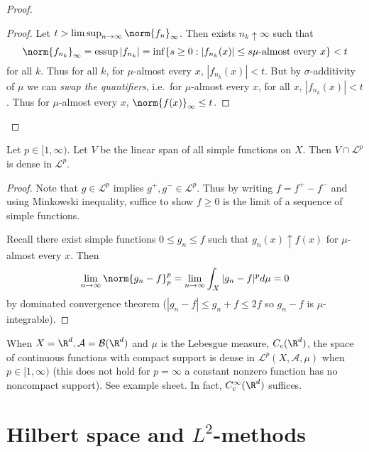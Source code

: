 \documentclass[a4paper]{article}
\DeclareMathOperator{\essup}{essup} %
\begin{document}
\begin{proof}
  \begin{proof}
    Let \(t > \limsup_{n \to \infty} \norm{f_n}_\infty\). Then exists \(n_k \uparrow \infty\) such that
    \[
      \norm{f_{n_k}}_\infty = \essup |f_{n_k}| = \inf \{s \geq 0: |f_{n_k}(x)| \leq s \mu\text{-almost every } x\} < t
    \]
    for all \(k\). Thus for all \(k\), for \(\mu\)-almost every \(x\), \(|f_{n_k}(x)| < t\). But by \(\sigma\)-additivity of \(\mu\) we can \emph{swap the quantifiers}, i.e.\ for \(\mu\)-almost every \(x\), for all \(x\), \(|f_{n_k}(x)| < t\). Thus for \(\mu\)-almost every \(x\), \(\norm{f(x)}_\infty \leq t\).
  \end{proof}
\end{proof}

\begin{proposition}
  Let \(p \in [1, \infty)\). Let \(V\) be the linear span of all simple functions on \(X\). Then \(V \cap \mathcal L^p\) is dense in \(\mathcal L^p\).
\end{proposition}

\begin{proof}
  Note that \(g \in \mathcal L^p\) implies \(g^+, g^- \in \mathcal L^p\). Thus by writing \(f = f^+ - f^-\) and using Minkowski inequality, suffice to show \(f \geq 0\) is the limit of a sequence of simple functions.

  Recall there exist simple functions \(0 \leq g_n \leq f\) such that \(g_n(x) \uparrow f(x)\) for \(\mu\)-almost every \(x\). Then
  \[
    \lim_{n \to \infty} \norm{g_n - f}_p^p = \lim_{n \to \infty} \int_X |g_n - f|^p d\mu = 0
  \]
  by dominated convergence theorem (\(|g_n - f| \leq g_n + f \leq 2f\) so \(g_n - f\) is \(\mu\)-integrable).
\end{proof}

\begin{remark}
  When \(X = \R^d, \mathcal A = \mathcal B(\R^d)\) and \(\mu\) is the Lebesgue measure, \(C_c(\R^d)\), the space of continuous functions with compact support is dense in \(\mathcal L^p(X, \mathcal A, \mu)\) when \(p \in [1, \infty)\) (this does not hold for \(p = \infty\) a constant nonzero function has no noncompact support). See example sheet. In fact, \(C_c^\infty(\R^d)\) suffices.
\end{remark}

\section{Hilbert space and \(L^2\)-methods}
\end{document}

